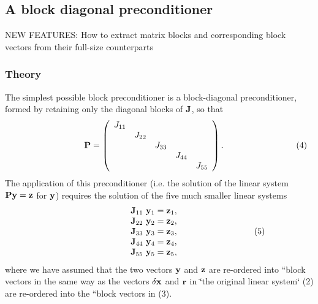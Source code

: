  

\hypertarget{index_diagonal}{}\subsection{A block diagonal preconditioner}\label{index_diagonal}
N\+EW F\+E\+A\+T\+U\+R\+ES\+: How to extract matrix blocks and corresponding block vectors from their full-\/size counterparts\hypertarget{index_diag_theory}{}\subsubsection{Theory}\label{index_diag_theory}
The simplest possible block preconditioner is a block-\/diagonal preconditioner, formed by retaining only the diagonal blocks of ${\bf J}$, so that \[ \hspace{3cm} {\bf P} = \left( \begin{array}{ccccc} J_{11} & & & & \\ & J_{22} & & & \\ & & J_{33} & & \\ & & & J_{44} & \\ & & & & J_{55} \\ \end{array} \right). \hspace{3cm} (4) \] The application of this preconditioner (i.\+e. the solution of the linear system ${\bf P} {\bf y} ={\bf z}$ for ${\bf y}$) requires the solution of the five much smaller linear systems \[ \hspace{3cm} \begin{array}{c} {\bf J}_{11} \ {\bf y}_1 = {\bf z}_1, \\ {\bf J}_{22} \ {\bf y}_2 = {\bf z}_2, \\ {\bf J}_{33} \ {\bf y}_3 = {\bf z}_3, \\ {\bf J}_{44} \ {\bf y}_4 = {\bf z}_4, \\ {\bf J}_{55} \ {\bf y}_5 = {\bf z}_5, \\ \end{array} \hspace{3cm} (5) \] where we have assumed that the two vectors ${\bf y}$ and ${\bf z}$ are re-\/ordered into ``block vectors\textquotesingle{}\textquotesingle{} in the same way as the vectors $\delta {\bf x}$ and ${\bf r}$ in \char`\"{}the original linear system\char`\"{} (2) are re-\/ordered into the ``block vectors\textquotesingle{}\textquotesingle{} in (3).

